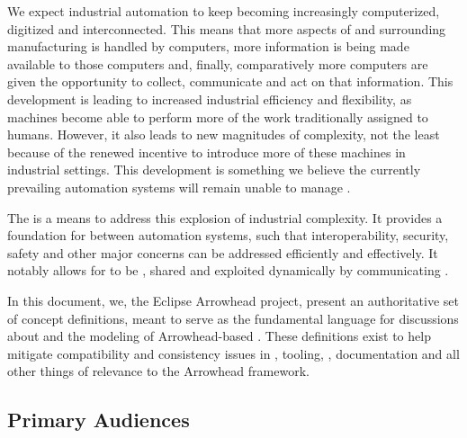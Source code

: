 %
%

We expect industrial automation to keep becoming increasingly computerized, digitized and interconnected.
This means that more aspects of and surrounding manufacturing is handled by computers, more information is being made available to those computers and, finally, comparatively more computers are given the opportunity to collect, communicate and act on that information.
This development is leading to increased industrial efficiency and flexibility, as machines become able to perform more of the work traditionally assigned to humans.
However, it also leads to new magnitudes of complexity, not the least because of the renewed incentive to introduce more of these machines in industrial settings.
This development is something we believe the currently prevailing automation systems will remain unable to manage \cite{delsing2017iot}.

The  is a means to address this explosion of industrial complexity.
It provides a foundation for  \cite{mackenzie2006reference} between automation systems, such that interoperability, security, safety and other major concerns can be addressed efficiently and effectively.
It notably allows for   to be , shared and exploited dynamically by communicating .

In this document, we, the Eclipse Arrowhead project, present an authoritative set of concept definitions, meant to serve as the fundamental language for discussions about and the modeling of Arrowhead-based .
These definitions exist to help mitigate compatibility and consistency issues in , tooling, , documentation and all other things of relevance to the Arrowhead framework.

\subsection{Primary Audiences}
\label{sec:introduction:audiences}

